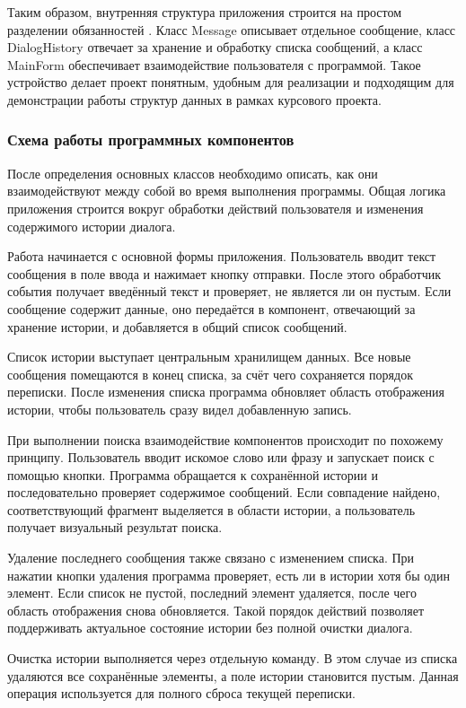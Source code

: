 \documentclass[12pt,a4paper]{article}
\begin{document}
Таким образом, внутренняя структура приложения строится на простом разделении обязанностей \cite{ref7,ref15}. Класс Message описывает отдельное сообщение, класс DialogHistory отвечает за хранение и обработку списка сообщений, а класс MainForm обеспечивает взаимодействие пользователя с программой. Такое устройство делает проект понятным, удобным для реализации и подходящим для демонстрации работы структур данных в рамках курсового проекта.

\subsubsection{Схема работы программных компонентов}

После определения основных классов необходимо описать, как они взаимодействуют между собой во время выполнения программы. Общая логика приложения строится вокруг обработки действий пользователя и изменения содержимого истории диалога.

Работа начинается с основной формы приложения. Пользователь вводит текст сообщения в поле ввода и нажимает кнопку отправки. После этого обработчик события получает введённый текст и проверяет, не является ли он пустым. Если сообщение содержит данные, оно передаётся в компонент, отвечающий за хранение истории, и добавляется в общий список сообщений.

Список истории выступает центральным хранилищем данных. Все новые сообщения помещаются в конец списка, за счёт чего сохраняется порядок переписки. После изменения списка программа обновляет область отображения истории, чтобы пользователь сразу видел добавленную запись.

При выполнении поиска взаимодействие компонентов происходит по похожему принципу. Пользователь вводит искомое слово или фразу и запускает поиск с помощью кнопки. Программа обращается к сохранённой истории и последовательно проверяет содержимое сообщений. Если совпадение найдено, соответствующий фрагмент выделяется в области истории, а пользователь получает визуальный результат поиска.

Удаление последнего сообщения также связано с изменением списка. При нажатии кнопки удаления программа проверяет, есть ли в истории хотя бы один элемент. Если список не пустой, последний элемент удаляется, после чего область отображения снова обновляется. Такой порядок действий позволяет поддерживать актуальное состояние истории без полной очистки диалога.

Очистка истории выполняется через отдельную команду. В этом случае из списка удаляются все сохранённые элементы, а поле истории становится пустым. Данная операция используется для полного сброса текущей переписки.
\end{document}
